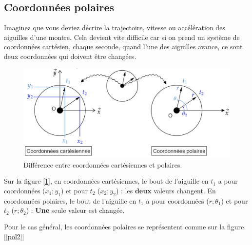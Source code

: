 \documentclass[
	11pt, %
	fleqn, %
	a4paper, %
]{LegrandOrangeBook}
\begin{document}
\subsection{Coordonnées polaires}
Imaginez que vous deviez décrire la trajectoire,  vitesse ou accélération des aiguilles d'une montre. Cela devient vite difficile car si on prend un système de coordonnées cartésien, chaque seconde, quand l'une des aiguilles avance, ce sont deux coordonnées qui doivent être changées. 

\begin{figure}[H] %
	\centering %
	\includegraphics[width=1\textwidth]{Images/pol1.png} %
	\caption{Différence entre coordonnées cartésiennes et polaires.}
	\label{pol1} %
\end{figure}

Sur la figure [\ref{pol1}], en coordonnées cartésiennes, le bout de l'aiguille en $t_1$ a pour coordonnées ($x_1; y_1$) et pour $t_2$ ($x_2 ; y_2$) : les \textbf{deux} valeurs changent. 
En coordonnées polaires, le bout de l'aiguille en $t_1$ a pour coordonnées ($r ; \theta_1$) et pour $t_2$ ($r ; \theta_2 $) : \textbf{Une} seule valeur est changée.

Pour le cas général, les coordonnées polaires se représentent comme sur la figure [\ref{pol2}]
\end{document}
